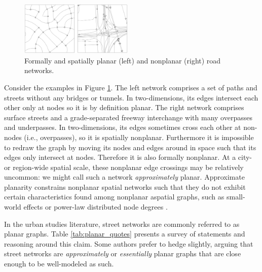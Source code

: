 \documentclass[Afour,sageh,times]{sagej}
\begin{document}
\begin{figure}[tbp]
	\center
	\includegraphics[width=0.48\textwidth]{planar_vs_not.png}
	\caption{Formally and spatially planar (left) and nonplanar (right) road networks.}
	\label{fig:planar_vs_not}
\end{figure}

Consider the examples in Figure \ref{fig:planar_vs_not}. The left network comprises a set of paths and streets without any bridges or tunnels. In two-dimensions, its edges intersect each other only at nodes so it is by definition planar. The right network comprises surface streets and a grade-separated freeway interchange with many overpasses and underpasses. In two-dimensions, its edges sometimes cross each other at non-nodes (i.e., overpasses), so it is spatially nonplanar. Furthermore it is impossible to redraw the graph by moving its nodes and edges around in space such that its edges only intersect at nodes. Therefore it is also formally nonplanar. At a city- or region-wide spatial scale, these nonplanar edge crossings may be relatively uncommon: we might call such a network \emph{approximately} planar. Approximate planarity constrains nonplanar spatial networks such that they do not exhibit certain characteristics found among nonplanar aspatial graphs, such as small-world effects or power-law distributed node degrees \citep{crucitti_centrality_2006,fischer_spatial_2014}.

In the urban studies literature, street networks are commonly referred to as planar graphs. Table \ref{tab:planar_quotes} presents a survey of statements and reasoning around this claim. Some authors prefer to hedge slightly, arguing that street networks are \emph{approximately} or \emph{essentially} planar graphs that are close enough to be well-modeled as such.
\end{document}
